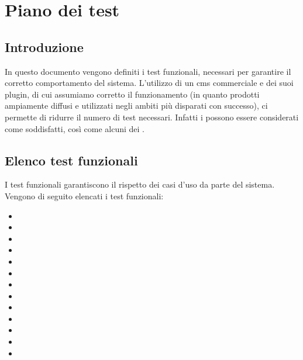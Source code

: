 \chapter{Piano dei test}
\section{Introduzione}
In questo documento vengono definiti i test funzionali, necessari per garantire il corretto comportamento del sistema.
L'utilizzo di un \gls{cms} commerciale e dei suoi plugin, di cui assumiamo corretto il funzionamento (in quanto prodotti ampiamente diffusi e utilizzati negli ambiti più disparati con successo), ci permette di ridurre il numero di test necessari.
Infatti i  possono essere considerati come soddisfatti, così come alcuni dei .

\section{Elenco test funzionali}
I test funzionali garantiscono il rispetto dei casi d'uso da parte del sistema.
Vengono di seguito elencati i test funzionali:
\begin{itemize}
	\item {}
	\item {}
	\item {}
	\item {}
	\item {}
	\item {}
	\item {}
	\item {}
	\item {}
	\item {}
	\item {}
	\item {}
	\item {}
\end{itemize}

